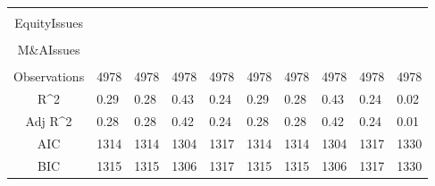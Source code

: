 \documentclass{article}
\begin{document}
\begin{table}[H]
\begin{tabular}{|clllllllll|}
   &  &  &  &  &  &  &  &  &  \\ 
  EquityIssues &  &  &  &  &  &  &  &  &  \\ 
   &  &  &  &  &  &  &  &  &  \\ 
  M\&AIssues &  &  &  &  &  &  &  &  &  \\ 
   &  &  &  &  &  &  &  &  &  \\ 
  \hline 
 Observations & 4978 & 4978 & 4978 & 4978 & 4978 & 4978 & 4978 & 4978 & 4978 \\ 
  R^2 & 0.29 & 0.28 & 0.43 & 0.24 & 0.29 & 0.28 & 0.43 & 0.24 & 0.02 \\ 
  Adj R^2 & 0.28 & 0.28 & 0.42 & 0.24 & 0.28 & 0.28 & 0.42 & 0.24 & 0.01 \\ 
  AIC & 1314 & 1314 & 1304 & 1317 & 1314 & 1314 & 1304 & 1317 & 1330 \\ 
  BIC & 1315 & 1315 & 1306 & 1317 & 1315 & 1315 & 1306 & 1317 & 1330 \\ 
   \hline
\end{tabular}
 
\end{table}
\end{document}
